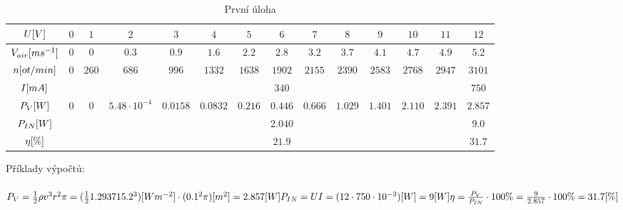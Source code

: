 \documentclass{article}
\begin{document}
\begin{minipage}[t]{\textwidth}
  \begin{table}[H]
    \centering
    \begin{tabular}{|c|c|c|c|c|c|c|c|c|c|c|c|c|c|}
      \hline
      \(U\-[V]\)	            & \(0\)	& \(1\)   & \(2\)                 & \(3\)       & \(4\)	      & \(5\)     & \(6\)     & \(7\)     & \(8\)	    & \(9\)     & \(10\)    & \(11\)    & \(12\)    \\ \hline
      \(V_{air}\-[ms^{-1}]\)  & \(0\)	& \(0\)   & \(0.3\)               & \(0.9\)     & \(1.6\)	    & \(2.2\)   & \(2.8\)   & \(3.2\)   & \(3.7\)	  & \(4.1\)   & \(4.7\)   & \(4.9\)   & \(5.2\)   \\ \hline
      \(n\-[ot/min]\)	        & \(0\)	& \(260\) & \(686\)               & \(996\)     & \(1332\)    & \(1638\)  & \(1902\)  & \(2155\)  & \(2390\)  & \(2583\)  & \(2768\)  & \(2947\)  & \(3101\)  \\ \hline
      \(I\-[mA]\)             &       &         &                       &             &             &           & \(340\)	  &           &           &           &           &           & \(750\)   \\ \hline \hline
      \(P_V\-[W]\)            & \(0\) & \(0\)   & \(5.48\cdot10^{-4}\)  & \(0.0158\)  & \(0.0832\)  & \(0.216\) & \(0.446\) & \(0.666\) & \(1.029\) & \(1.401\) & \(2.110\) & \(2.391\) & \(2.857\) \\ \hline
      \(P_{IN}\-[W]\)         &       &         &                       &             &             &           & \(2.040\) &           &           &           &           &           & \(9.0\)   \\ \hline
      \(\eta\-[\%]\)          &       &         &                       &             &             &           & \(21.9\)  &           &           &           &           &           & \(31.7\)  \\ \hline
    \end{tabular}
    \caption{\label{tabulka_mereni} První úloha}
  \end{table}
\end{minipage}

Příklady výpočtů: \\
\\
\large
\(
  P_V = \frac{1}{2} \rho v^3 r^2\pi = (\frac{1}{2} 1.29371 5.2^3)\-[Wm^{-2}] \cdot (0.1^2\pi)\-[m^2]= 2.857\-[W] \\ \\
  P_{IN} = UI = (12 \cdot 750\cdot10^{-3})\-[W] = 9\-[W]  \\ \\
  \eta = \frac{P_V}{P_{IN}} \cdot 100\% = \frac{9}{2.857} \cdot 100\% = 31.7\-[\%] 
\)
\normalsize \\
\end{document}
